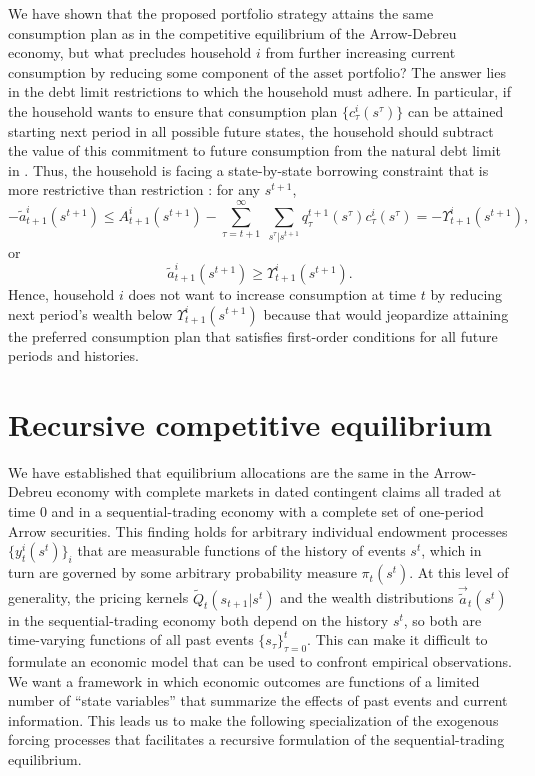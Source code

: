 We have shown that the proposed portfolio strategy attains the same
consumption plan
as in the competitive equilibrium of the Arrow-Debreu economy, but what
precludes household $i$ from further increasing current consumption by
reducing some component of the asset portfolio? The answer lies
in the debt limit restrictions to which the household must adhere. In
particular,
if the household wants to ensure that consumption plan
$\{c^i_\tau(s^\tau)\}$
can be attained starting next period in all possible future states,
the household should subtract the value of this commitment to future
consumption
from the natural debt limit in .
 Thus, the household is facing a
state-by-state borrowing constraint that is more
 restrictive than restriction :
for any $s^{t+1}$,
$$  -  \tilde a^i_{t+1}(s^{t+1}) \leq  A^i_{t+1}(s^{t+1} )
- \sum_{\tau=t+1}^\infty \; \sum_{s^\tau \vert s^{t+1}}
  q_\tau^{t+1}(s^\tau) c^i_\tau(s^\tau)
  = - \Upsilon^i_{t+1}(s^{t+1}),$$
or
$$   \tilde a^i_{t+1}(s^{t+1})  \geq  \Upsilon^i_{t+1}(s^{t+1}). $$
Hence, household $i$ does not want to increase consumption at time $t$ by
reducing next period's wealth below $\Upsilon^i_{t+1}(s^{t+1})$ because
that would jeopardize attaining the preferred consumption plan
that satisfies first-order conditions  for all future periods and
histories.








\section{Recursive competitive equilibrium}\label{sec:Markovs}%
We have established that  equilibrium allocations are the same
in the Arrow-Debreu economy with  complete markets in dated
contingent claims all traded at time 0 and in a sequential-trading
economy with a complete set of one-period Arrow securities. This finding
holds for arbitrary individual endowment processes
$\{y^i_t(s^t)\}_i$ that are measurable functions of the history of
events $s^t$, which in turn are governed by some arbitrary
probability measure $\pi_t(s^t)$. At this level of generality,
 the pricing kernels $\tilde Q_t(s_{t+1} | s^t)$ and the
wealth distributions $\vec {\tilde a}_t(s^t)$ in the
sequential-trading economy both depend on the history $s^t$, so both
 are time-varying functions of all past events
$\{s_\tau\}_{\tau=0}^t$. This can make it  difficult to
formulate an economic model that can be used to confront empirical
observations. We want  a framework in which economic outcomes
are functions of a limited number of ``state variables'' that
summarize the effects of past events and current information. This
 leads us to make the following specialization of the
exogenous forcing processes that facilitates a recursive formulation
of the sequential-trading equilibrium.


